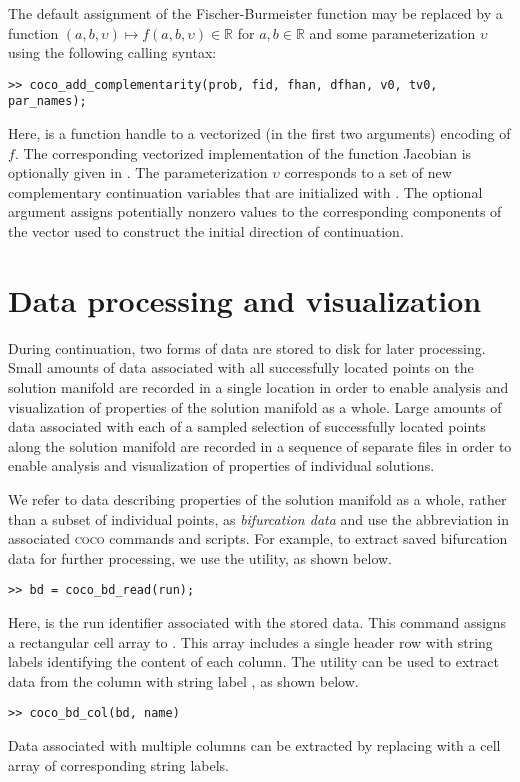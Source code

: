 The default assignment of the Fischer-Burmeister function may be replaced by a function $(a,b,\upsilon)\mapsto f(a,b,\upsilon)\in\mathbb{R}$ for $a,b\in\mathbb{R}$ and some parameterization $\upsilon$ using the following calling syntax:
\begin{lstlisting}[language=coco-highlight]
>> coco_add_complementarity(prob, fid, fhan, dfhan, v0, tv0, par_names);
\end{lstlisting}
Here,  is a function handle to a vectorized (in the first two arguments) encoding of $f$. The corresponding vectorized implementation of the function Jacobian is optionally given in . The parameterization $\upsilon$ corresponds to a set of new complementary continuation variables that are initialized with . The optional argument  assigns potentially nonzero values  to the corresponding components of the vector used to construct the initial direction of continuation.



\section{Data processing and visualization}

During continuation, two forms of data are stored to disk for later processing. Small amounts of data associated with all successfully located points on the solution manifold are recorded in a single location in order to enable analysis and visualization of properties of the solution manifold as a whole. Large amounts of data associated with each of a sampled selection of successfully located points along the solution manifold are recorded in a sequence of separate files in order to enable analysis and visualization of properties of individual solutions.

We refer to data describing properties of the solution manifold as a whole, rather than a subset of individual points, as \textit{bifurcation data} and use the abbreviation  in associated \textsc{coco} commands and scripts. For example, to extract saved bifurcation data for further processing, we use the  utility, as shown below.
 \begin{lstlisting}[language=coco-highlight]
>> bd = coco_bd_read(run);
\end{lstlisting}
Here,  is the run identifier associated with the stored data. This command assigns a rectangular cell array to . This array includes a single header row with string labels identifying the content of each column. The  utility can be used to extract data from the column with string label , as shown below.
 \begin{lstlisting}[language=coco-highlight]
>> coco_bd_col(bd, name)
\end{lstlisting}
Data associated with multiple columns can be extracted by replacing  with a cell array of corresponding string labels.

